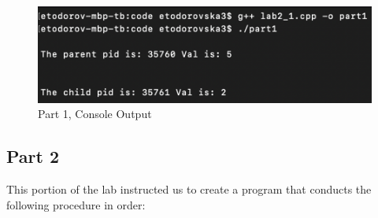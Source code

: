         \begin{figure}[H]
            \centering
            \includegraphics[width=\linewidth]{figures/Part1Output.png}
            \caption{Part 1, Console Output}
            \label{fig:part1_output}
        \end{figure}



    \newpage
    \subsection{Part 2}\label{subsec:part2}
        This portion of the lab instructed us to create a program that conducts the following procedure in order:

